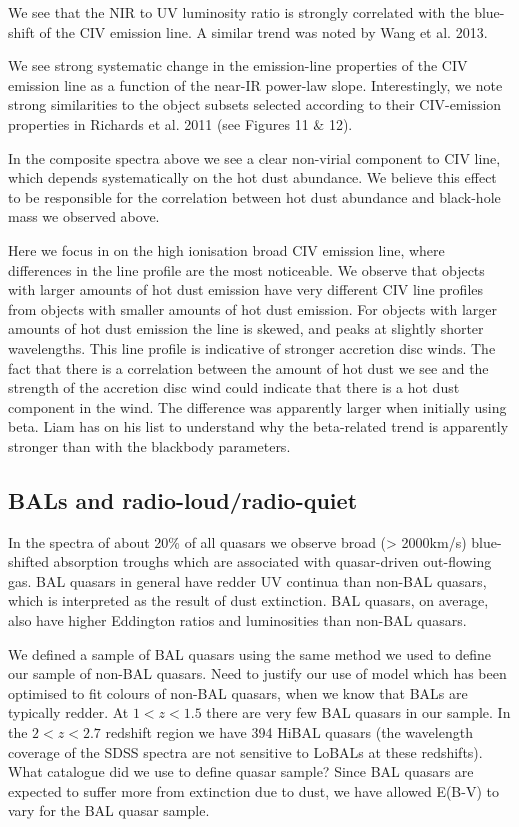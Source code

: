 We see that the NIR to UV luminosity ratio is strongly correlated with the blue-shift of the CIV emission line. 
A similar trend was noted by Wang et al. 2013. 

We see strong systematic change in the emission-line properties of the CIV emission line as a function of the near-IR power-law slope. 
Interestingly, we note strong similarities to the object subsets selected according to their CIV-emission properties in Richards et al. 2011 (see Figures 11 \& 12).  

In the composite spectra above we see a clear non-virial component to CIV line, which depends systematically on the hot dust abundance. 
We believe this effect to be responsible for the correlation between hot dust abundance and black-hole mass we observed above. 

Here we focus in on the high ionisation broad CIV emission line, where differences in the line profile are the most noticeable. 
We observe that objects with larger amounts of hot dust emission have very different CIV line profiles from objects with smaller amounts of hot dust emission. 
For objects with larger amounts of hot dust emission the line is skewed, and peaks at slightly shorter wavelengths. 
This line profile is indicative of stronger accretion disc winds. 
The fact that there is a correlation between the amount of hot dust we see and the strength of the accretion disc wind could indicate that there is a hot dust component in the wind. 
The difference was apparently larger when initially using beta. 
Liam has on his list to understand why the beta-related trend is apparently stronger than with the blackbody parameters.

\subsection{BALs and radio-loud/radio-quiet}

In the spectra of about 20\% of all quasars we observe broad (> 2000km/s) blue-shifted absorption troughs which are associated with quasar-driven out-flowing gas. BAL quasars in general have redder UV continua than non-BAL quasars, which is interpreted as the result of dust extinction. BAL quasars, on average, also have higher Eddington ratios and luminosities than non-BAL quasars.

We defined a sample of BAL quasars using the same method we used to define our sample of non-BAL quasars. Need to justify our use of model which has been optimised to fit colours of non-BAL quasars, when we know that BALs are typically redder. At $1 < z < 1.5$ there are very few BAL quasars in our sample. In the $2 < z < 2.7$ redshift region we have 394 HiBAL quasars (the wavelength coverage of the SDSS spectra are not sensitive to LoBALs at these redshifts). What catalogue did we use to define quasar sample? Since BAL quasars are expected to suffer more from extinction due to dust, we have allowed E(B-V) to vary for the BAL quasar sample. 

